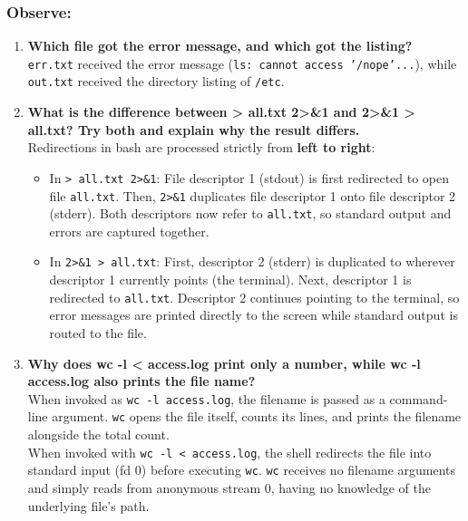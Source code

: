 \documentclass{labreport}
\begin{document}
\subsubsection*{Observe:}
\begin{enumerate}[leftmargin=*]
    \item \textbf{Which file got the error message, and which got the listing?}\\[0.2em]
    \texttt{err.txt} received the error message (\texttt{ls: cannot access '/nope'...}), while \texttt{out.txt} received the directory listing of \texttt{/etc}.

    \item \textbf{What is the difference between > all.txt 2>\&1 and 2>\&1 > all.txt? Try both and explain why the result differs.}\\[0.2em]
    Redirections in bash are processed strictly from \textbf{left to right}:
    \begin{itemize}[noitemsep, topsep=2pt]
        \item In \texttt{> all.txt 2>\&1}: File descriptor 1 (stdout) is first redirected to open file \texttt{all.txt}. Then, \texttt{2>\&1} duplicates file descriptor 1 onto file descriptor 2 (stderr). Both descriptors now refer to \texttt{all.txt}, so standard output and errors are captured together.
        \item In \texttt{2>\&1 > all.txt}: First, descriptor 2 (stderr) is duplicated to wherever descriptor 1 currently points (the terminal). Next, descriptor 1 is redirected to \texttt{all.txt}. Descriptor 2 continues pointing to the terminal, so error messages are printed directly to the screen while standard output is routed to the file.
    \end{itemize}

    \item \textbf{Why does wc -l < access.log print only a number, while wc -l access.log also prints the file name?}\\[0.2em]
    When invoked as \texttt{wc -l access.log}, the filename is passed as a command-line argument. \texttt{wc} opens the file itself, counts its lines, and prints the filename alongside the total count.\\
    When invoked with \texttt{wc -l < access.log}, the shell redirects the file into standard input (fd 0) before executing \texttt{wc}. \texttt{wc} receives no filename arguments and simply reads from anonymous stream 0, having no knowledge of the underlying file's path.


\end{enumerate}
\end{document}

